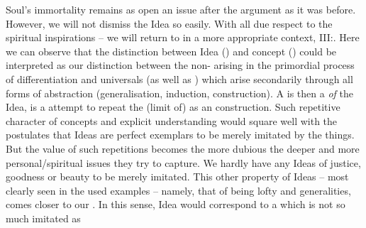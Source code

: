 Soul's immortality remains as open an issue after the argument as it was before.
However, we will not dismiss the Idea so easily. With all due respect to the
spiritual inspirations -- we will return to  in a more
appropriate context, III:. Here we can observe that the
distinction between Idea () and concept ()  could be interpreted as our distinction
between the non- arising in the primordial process of
differentiation and universals (as well as ) which arise
secondarily through all forms of  abstraction (generalisation,
induction, construction). A  is then a  {\em of} the
Idea, is a  attempt to repeat the (limit of)  as an  construction. Such repetitive character of
concepts and explicit understanding would square well with the postulates that
Ideas are perfect exemplars to be merely imitated by the  things. But
the value of such repetitions becomes the more dubious the deeper and more
personal/spiritual issues they try to capture.  We hardly have any  Ideas
of justice, goodness or beauty to be merely imitated. This other property of
Ideas -- most clearly seen in the used examples -- namely, that of being lofty
and  generalities, comes closer to our . In this sense,
Idea would correspond to a  which is not so much imitated as
